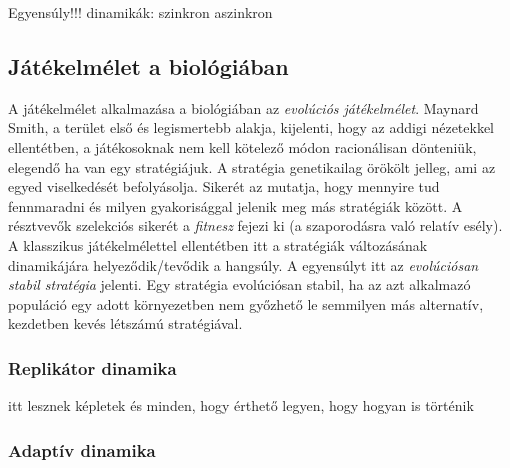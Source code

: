 Egyensúly!!!
dinamikák: szinkron aszinkron

\subsection{Játékelmélet a biológiában}
A játékelmélet alkalmazása a biológiában az \textit{evolúciós játékelmélet}. Maynard Smith, a terület első és legismertebb alakja, kijelenti, hogy az addigi nézetekkel ellentétben, a játékosoknak nem kell kötelező módon racionálisan dönteniük, elegendő ha van egy stratégiájuk. A stratégia genetikailag örökölt jelleg, ami az egyed viselkedését befolyásolja. Sikerét az mutatja, hogy mennyire tud fennmaradni és milyen gyakorisággal jelenik meg más stratégiák között. A résztvevők szelekciós sikerét a \textit{fitnesz} fejezi ki (a szaporodásra való relatív esély). A klasszikus játékelmélettel ellentétben itt a stratégiák változásának dinamikájára helyeződik/tevődik a hangsúly. A egyensúlyt itt az \textit{evolúciósan stabil stratégia} jelenti. Egy stratégia evolúciósan stabil, ha az azt alkalmazó populáció egy adott környezetben nem győzhető le semmilyen más alternatív, kezdetben kevés létszámú stratégiával.

\subsubsection{Replikátor dinamika}
itt lesznek képletek és minden, hogy érthető legyen, hogy hogyan is történik
\subsubsection{Adaptív dinamika}

\iffalse
Kezdetben a darwini kiválasztódást próbálták modellezni a játékelmélet eszközeinek segítségével. 


Játékok típusai, osztályozás
Evol. játékok mint egy ág

\subsection{Evolúciós stabil stratégia -- fitnesz mint nyereség}
\subsection{Játékok dinamikája(Dynamic game theory)}
\subsubsection{Replikátor dinamika}
\subsubsection{Adaptív dinamika (Adaptive dynamics)}
\subsection{Térbeli játékok (spatial games)}

\fi


